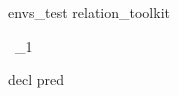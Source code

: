 \begin{zsection}
\SECTION envs\_test \parents relation\_toolkit
\end{zsection}

\begin{zed}
\dcat~_1
\begin{axdef}
decl
\where
pred
\end{axdef}
\end{zed}


